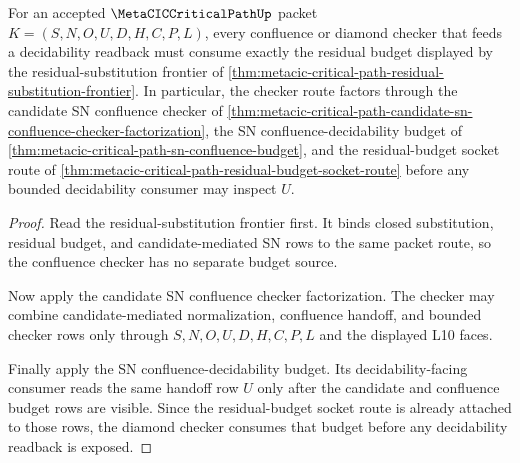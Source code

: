 \begin{theorem}
\label{thm:metacic-critical-path-diamond-budget}
For an accepted $\MetaCICCriticalPathUp$ packet $K=(S,N,O,U,D,H,C,P,L)$, every confluence or diamond checker that feeds a decidability readback must consume exactly the residual budget displayed by the residual-substitution frontier of \autoref{thm:metacic-critical-path-residual-substitution-frontier}. In particular, the checker route factors through the candidate SN confluence checker of \autoref{thm:metacic-critical-path-candidate-sn-confluence-checker-factorization}, the SN confluence-decidability budget of \autoref{thm:metacic-critical-path-sn-confluence-budget}, and the residual-budget socket route of \autoref{thm:metacic-critical-path-residual-budget-socket-route} before any bounded decidability consumer may inspect $U$.
\end{theorem}
\begin{proof}
Read the residual-substitution frontier first. It binds closed substitution, residual budget, and candidate-mediated SN rows to the same packet route, so the confluence checker has no separate budget source.

Now apply the candidate SN confluence checker factorization. The checker may combine candidate-mediated normalization, confluence handoff, and bounded checker rows only through $S,N,O,U,D,H,C,P,L$ and the displayed L10 faces.

Finally apply the SN confluence-decidability budget. Its decidability-facing consumer reads the same handoff row $U$ only after the candidate and confluence budget rows are visible. Since the residual-budget socket route is already attached to those rows, the diamond checker consumes that budget before any decidability readback is exposed.
\end{proof}

